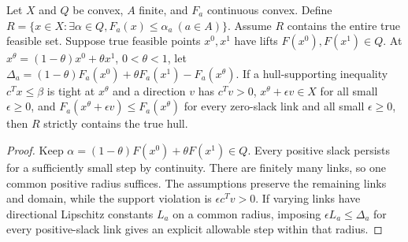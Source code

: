 \begin{proposition}\label{prop:psplit-repair}
Let $X$ and $Q$ be convex, $A$ finite, and $F_a$ continuous convex. Define
$R=\{x\in X:\exists\alpha\in Q,F_a(x)\le\alpha_a\ (a\in A)\}$.
Assume $R$ contains the entire true feasible set. Suppose true feasible points $x^0,x^1$ have lifts $F(x^0),F(x^1)\in Q$.
At $x^\theta=(1-\theta)x^0+\theta x^1$, $0<\theta<1$, let
$\Delta_a=(1-\theta)F_a(x^0)+\theta F_a(x^1)-F_a(x^\theta)$.
If a hull-supporting inequality $c^Tx\le\beta$ is tight at $x^\theta$
and a direction $v$ has $c^Tv>0$, $x^\theta+\epsilon v\in X$ for all
small $\epsilon\ge0$, and
$F_a(x^\theta+\epsilon v)\le F_a(x^\theta)$ for every zero-slack link
and all small $\epsilon\ge0$, then $R$ strictly contains the true hull.
\end{proposition}
\begin{proof}
Keep $\alpha=(1-\theta)F(x^0)+\theta F(x^1)\in Q$. Every positive
slack persists for a sufficiently small step by continuity. There are
finitely many links, so one common positive radius suffices. The assumptions
preserve the remaining links and domain, while the support violation is
$\epsilon c^Tv>0$. If varying links have directional Lipschitz constants
$L_a$ on a common radius, imposing $\epsilon L_a\le\Delta_a$ for every
positive-slack link gives an explicit allowable step within that radius.
\end{proof}

